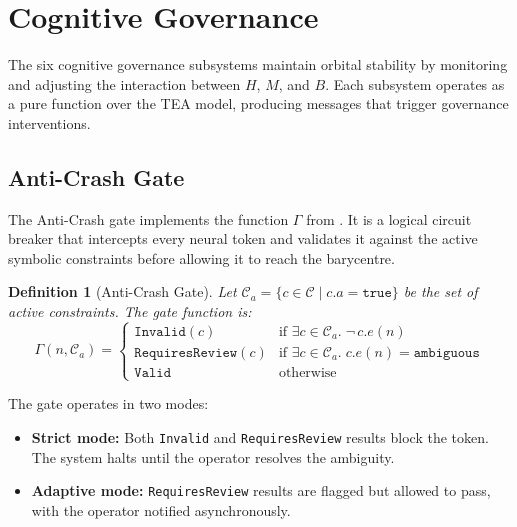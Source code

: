 \documentclass[11pt,a4paper]{article}
\newtheorem{definition}{Definition}[section]
\newcommand{\tea}{\textsc{TEA}}
\begin{document}
\section{Cognitive Governance}\label{sec:governance}

The six cognitive governance subsystems maintain orbital stability
by monitoring and adjusting the interaction between $H$, $M$, and
$B$. Each subsystem operates as a pure function over the \tea{}
model, producing messages that trigger governance interventions.

\subsection{Anti-Crash Gate}

The Anti-Crash gate implements the function $\Gamma$ from
. It is a logical circuit breaker that
intercepts every neural token and validates it against the active
symbolic constraints before allowing it to reach the barycentre.

\begin{definition}[Anti-Crash Gate]\label{def:anticrash}
Let $\mathcal{C}_a = \{c \in \mathcal{C} \mid c.a = \texttt{true}\}$
be the set of active constraints. The gate function is:
\[
  \Gamma(n, \mathcal{C}_a) = \begin{cases}
    \texttt{Invalid}(c) & \text{if } \exists c \in \mathcal{C}_a.\;
      \lnot\, c.e(n) \\
    \texttt{RequiresReview}(c) & \text{if } \exists c \in \mathcal{C}_a.\;
      c.e(n) = \texttt{ambiguous} \\
    \texttt{Valid} & \text{otherwise}
  \end{cases}
\]
\end{definition}

The gate operates in two modes:
\begin{itemize}
  \item \textbf{Strict mode:} Both \texttt{Invalid} and
    \texttt{RequiresReview} results block the token. The system halts
    until the operator resolves the ambiguity.
  \item \textbf{Adaptive mode:} \texttt{RequiresReview} results are
    flagged but allowed to pass, with the operator notified
    asynchronously.
\end{itemize}
\end{document}
